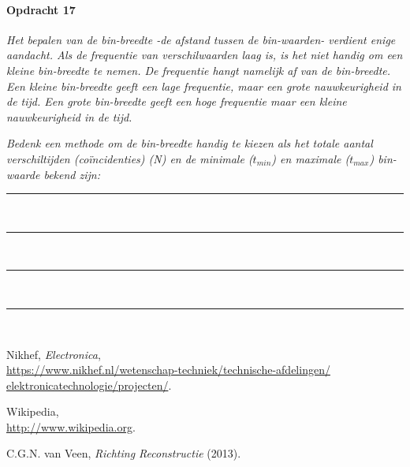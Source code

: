 \begin{minipage}[t]{1\columnwidth}%

\paragraph{Opdracht 17}

\textit{Het bepalen van de bin-breedte -de afstand tussen de bin-waarden-
verdient enige aandacht. Als de frequentie van verschilwaarden laag
is, is het niet handig om een kleine bin-breedte te nemen. De frequentie
hangt namelijk af van de bin-breedte. Een kleine bin-breedte geeft
een lage frequentie, maar een grote nauwkeurigheid in de tijd. Een
grote bin-breedte geeft een hoge frequentie maar een kleine nauwkeurigheid
in de tijd.}

\textit{Bedenk een methode om de bin-breedte handig te kiezen als
het totale aantal verschiltijden (coïncidenties) (N) en de minimale
($t_{min}$) en maximale ($t_{max}$) bin-waarde bekend zijn:}

\begin{center}
    \rule{\textwidth}{0.3mm}\\
    \rule{\textwidth}{0.3mm}\\
    \rule{\textwidth}{0.3mm}\\
    \rule{\textwidth}{0.3mm}\\
\end{center}
\end{minipage}


\begin{thebibliography}{9}
     Nikhef, \emph{\hisparc Electronica},\\
    \url{https://www.nikhef.nl/wetenschap-techniek/technische-afdelingen/
         elektronicatechnologie/projecten/}.

     Wikipedia, \\
    \url{http://www.wikipedia.org}.

     C.G.N. van Veen, \emph{Richting
    Reconstructie} (2013).
\end{thebibliography}


